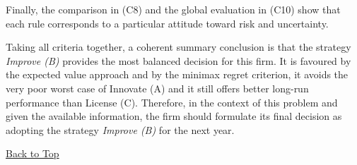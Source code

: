 	Finally, the comparison in (C8) and the global evaluation in (C10) show that each rule corresponds to a particular attitude
	toward risk and uncertainty.
	
	Taking all criteria together, a coherent summary conclusion is that the strategy \emph{Improve (B)}
	provides the most balanced decision for this firm.
	It is favoured by the expected value approach and by the minimax regret criterion,
	it avoids the very poor worst case of Innovate (A) and it still offers better long-run performance than License (C).
	Therefore, in the context of this problem and given the available information,
	the firm should formulate its final decision as adopting the strategy \emph{Improve (B)} for the next year.
	
	\vspace{6pt}
	\noindent\hyperref[table-of-contents]{Back to Top}
